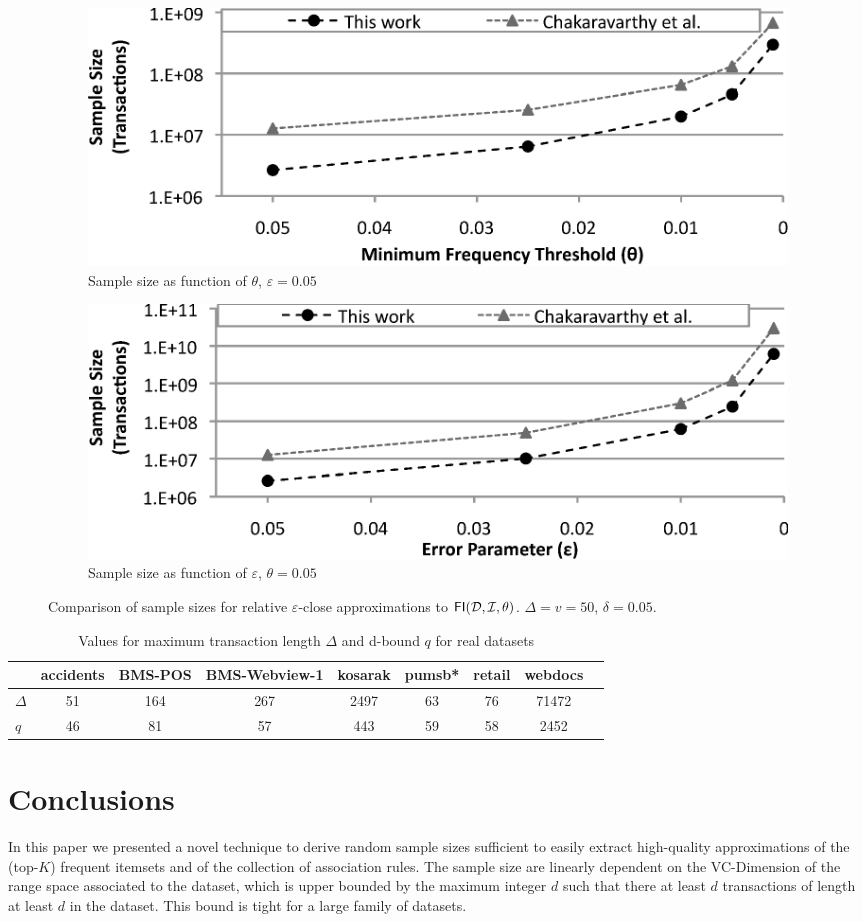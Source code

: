 \begin{figure}[htb]
  \centering
  \begin{subfigure}[b]{\linewidth}
    \centering
    \includegraphics[width=0.75\linewidth]{vcmine/Fig5a}
    \caption{Sample size as function of $\theta$, $\varepsilon=0.05$}
     \label{fig:compareSamSizeTheta}
   \end{subfigure}

  \begin{subfigure}[b]{\linewidth}
    \centering
    \includegraphics[width=0.75\linewidth]{vcmine/Fig5b}
    \caption{Sample size as function of $\varepsilon$, $\theta=0.05$}
    \label{fig:compareSamSizeEpsilon}
  \end{subfigure}
  \caption{Comparison of sample sizes for relative $\varepsilon$-close approximations to
  $\mathsf{FI}({\cal D},{\cal I},\theta)$. $\Delta=v=50$, $\delta=0.05$.}
  \label{fig:compareSamSize}
\end{figure}

\begin{table}[hbt]
\centering
\caption{Values for maximum transaction length $\Delta$ and d-bound $q$ for real datasets}
\label{tab:deltadrealds}

\begin{tabular}{lcccccccc}
  \toprule
  & accidents & BMS-POS & BMS-Webview-1 & kosarak & pumsb* & retail & webdocs \\
  \midrule
  $\Delta$ & 51 & 164 & 267 & 2497 & 63 & 76 & 71472 \\
  $q$ & 46 & 81 & 57 & 443 & 59 & 58 & 2452 \\ 
  \bottomrule
\end{tabular}
\end{table}

\section{Conclusions}\label{sec:vcmineconcl}
In this paper we presented a novel technique to derive random sample sizes
sufficient to easily extract high-quality approximations of the (top-$K$)
frequent itemsets and of the collection of association rules. The sample size
are linearly dependent on the VC-Dimension of the range space associated to the
dataset, which is upper bounded by the maximum integer $d$ such
that there at least $d$ transactions of length at least $d$ in the dataset. This 
bound is tight for a large family of datasets.  

